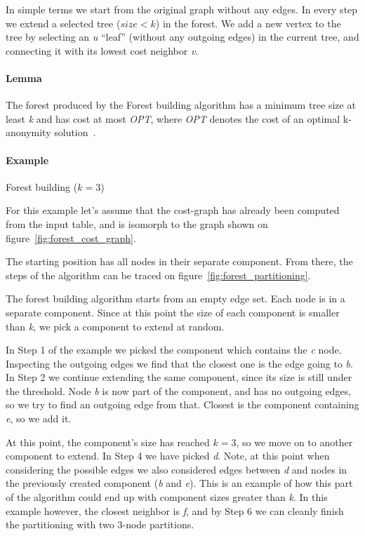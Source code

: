 In simple terms we start from the original graph without any edges.
In every step we extend a selected tree (\(size < k\)) in the forest.
We add a new vertex to the tree by selecting an \textit{u} ``leaf'' (without any outgoing edges) in the current tree, and connecting it with its lowest cost neighbor \textit{v}.

\paragraph{Lemma} The forest produced by the Forest building algorithm has a minimum tree size at least \textit{k} and has cost at most \textit{OPT}, where \textit{OPT} denotes the cost of an optimal k-anonymity solution~\cite{aggarwal}.

\paragraph{Example} Forest building (\(k=3\))\label{sec:forest_building_example}

For this example let's assume that the cost-graph has already been computed from the input table, and is isomorph to the graph shown on figure~\ref{fig:forest_cost_graph}.

\vspace{\baselineskip}


The starting position has all nodes in their separate component.
From there, the steps of the algorithm can be traced on figure~\ref{fig:forest_partitioning}.



The forest building algorithm starts from an empty edge set.
Each node is in a separate component.
Since at this point the size of each component is smaller than \textit{k}, we pick a component to extend at random.

In Step 1 of the example we picked the component which contains the \textit{c} node.
Inspecting the outgoing edges we find that the closest one is the edge going to \textit{b}.
In Step 2 we continue extending the same component, since its size is still under the threshold.
Node \textit{b} is now part of the component, and has no outgoing edges, so we try to find an outgoing edge from that.
Closest is the component containing \textit{e}, so we add it.

At this point, the component's size has reached \(k=3\), so we move on to another component to extend.
In Step 4 we have picked \textit{d}.
Note, at this point when considering the possible edges we also considered edges between \textit{d} and nodes in the previously created component (\textit{b} and \textit{e}).
This is an example of how this part of the algorithm could end up with component sizes greater than \textit{k}.
In this example however, the closest neighbor is \textit{f}, and by Step 6 we can cleanly finish the partitioning with two 3-node partitions.

